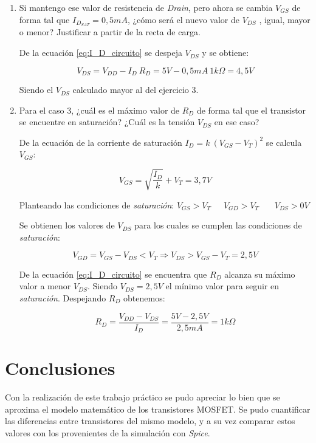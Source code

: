 \documentclass[10pt,spanish,a4paper,openany,notitlepage]{article}
\begin{document}
\begin{enumerate}
\item  Si mantengo ese valor de resistencia de \emph{Drain}, pero ahora se cambia $V_{GS}$ de forma tal que
$I_{D_{SAT}} = 0,5 \unit{mA}$, ¿cómo será el nuevo valor de $V_{DS}$ , igual, mayor o menor? Justificar a partir de la recta de carga.

De la ecuación \ref{eq:I_D_circuito} se despeja $V_{DS}$ y se obtiene:

\[ \displaystyle V_{DS} = V_{DD} - I_D\ R_D = 5 \unit{V} - 0,5 \unit{mA} \ 1 \unit{k\Omega} = 4,5 \unit{V} \]

Siendo el $V_{DS}$ calculado mayor al del ejercicio 3.

\item  Para el caso 3, ¿cuál es el máximo valor de $R_D$ de forma tal que el transistor se encuentre en
saturación? ¿Cuál es la tensión $V_{DS}$ en ese caso?

De la ecuación de la corriente de saturación $I_D = k\ (V_{GS} - V_T)^2$ se  calcula $V_{GS}$:

\[ \displaystyle V_{GS} = \sqrt{\frac{I_D}{k}} + V_T = 3,7 \unit{V}\]

Planteando las condiciones de \emph{saturación}: $V_{GS} > V_T$\ \ \ $V_{GD} > V_T$ \ \ \  $V_{DS} > 0 \unit{V}$

Se obtienen los valores de $V_{DS}$ para los cuales se cumplen las condiciones de \emph{saturación}:

\[ \displaystyle  V_{GD} = V_{GS} - V_{DS} < V_T   \Longrightarrow V_{DS} > V_{GS} - V_{T} = 2,5 \unit{V} \]
 
De la ecuación \ref{eq:I_D_circuito} se encuentra que $R_D$ alcanza su máximo valor a menor $V_{DS}$. Siendo $V_{DS} = 2,5\unit{V}$ el mínimo valor para seguir en \emph{saturación}.
Despejando $R_D$ obtenemos:

\[ \displaystyle R_D = \frac{V_{DD} - V_{DS}}{I_D} = \frac{5 \unit{V} - 2,5\unit{V} }{2,5 \unit{mA}} = 1\unit{k\Omega} \]

\end{enumerate}

\section{Conclusiones}

Con la realización de este trabajo práctico se pudo apreciar lo bien
que se aproxima el modelo matemático de los transistores MOSFET. Se
pudo cuantificar las diferencias entre transistores del mismo modelo,
y a su vez comparar estos valores con los provenientes de la
simulación con \emph{Spice}.
\end{document}
